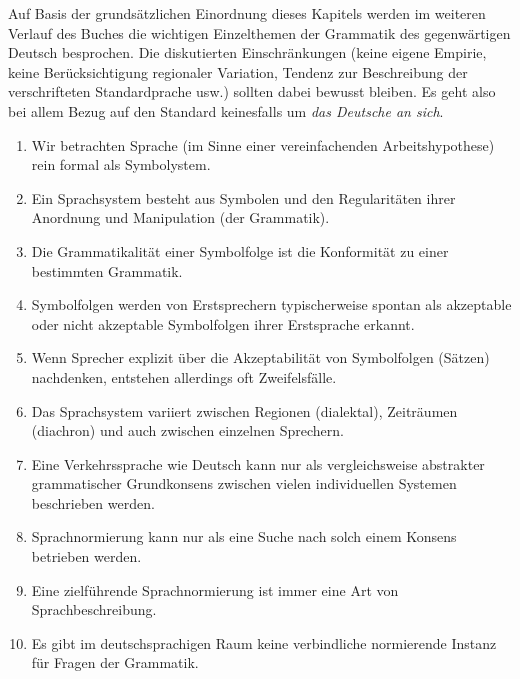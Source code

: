 Auf Basis der grundsätzlichen Einordnung dieses Kapitels werden im weiteren Verlauf des Buches die wichtigen Einzelthemen der Grammatik des gegenwärtigen Deutsch besprochen.
Die diskutierten Einschränkungen (keine eigene Empirie, keine Berücksichtigung regionaler Variation, Tendenz zur Beschreibung der verschrifteten Standardprache usw.) sollten dabei bewusst bleiben.
Es geht also bei allem Bezug auf den Standard keinesfalls um \textit{das Deutsche an sich}.

\Zusammenfassung

\begin{enumerate}
  \item Wir betrachten Sprache (im Sinne einer vereinfachenden Arbeitshypothese) rein formal als Symbolystem.
  \item Ein Sprachsystem besteht aus Symbolen und den Regularitäten ihrer Anordnung und Manipulation (der Grammatik).
  \item Die Grammatikalität einer Symbolfolge ist die Konformität zu einer bestimmten Grammatik.
  \item Symbolfolgen werden von Erstsprechern typischerweise spontan als akzeptable oder nicht akzeptable Symbolfolgen ihrer Erstsprache erkannt.
  \item Wenn Sprecher explizit über die Akzeptabilität von Symbolfolgen (\zB Sätzen) nachdenken, entstehen allerdings oft Zweifelsfälle.
  \item Das Sprachsystem variiert zwischen Regionen (dialektal), Zeiträumen (diachron) und auch zwischen einzelnen Sprechern.
  \item Eine Verkehrssprache wie Deutsch kann nur als vergleichsweise abstrakter grammatischer Grundkonsens zwischen vielen individuellen Systemen beschrieben werden.
  \item Sprachnormierung kann nur als eine Suche nach solch einem Konsens betrieben werden.
  \item Eine zielführende Sprachnormierung ist immer eine Art von Sprachbeschreibung.
  \item Es gibt im deutschsprachigen Raum keine verbindliche normierende Instanz für Fragen der Grammatik.
\end{enumerate}

